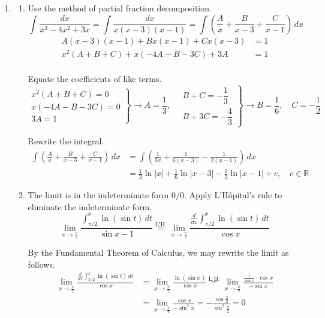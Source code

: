 \documentclass[a4paper, 12pt]{article}
\begin{document}
\begin{enumerate}[leftmargin=*,label=\textbf{\arabic*.}]

\item \begin{enumerate}[leftmargin=*,label=\textbf{\alph*.}]
\item Use the method of partial fraction decomposition.
\[\int\frac{dx}{x^3-4x^2+3x}=\int\frac{dx}{x(x-3)(x-1)}=\int\left(\frac Ax+\frac B{x-3}+\frac C{x-1}\right)\,dx\]
\[\begin{array}{rc}A(x-3)(x-1)+Bx(x-1)+Cx(x-3)&=1\\x^2(A+B+C)+x(-4A-B-3C)+3A&=1\\&\end{array}\]

Equate the coefficients of like terms.
\[\left.\begin{array}{r}
x^2(A+B+C)=0\\
x(-4A-B-3C)=0\\
3A=1
\end{array}\right\}\rightarrow A=\frac13,\quad\left.\begin{array}{r}
B+C=-\dfrac13\\[1em]
B+3C=-\dfrac43
\end{array}\right\}\rightarrow B=\frac16,\quad C=-\frac12\]

Rewrite the integral.
\begin{align*}
\int\left(\frac Ax+\frac B{x-3}+\frac C{x-1}\right)\,dx&=\int\left(\frac1{3x}+\frac1{6(x-3)}-\frac1{2(x-1)}\right)\,dx\\[1em]&=\boxed{\frac13\ln|x|+\frac16\ln|x-3|-\frac12\ln|x-1|+c,\quad c\in\mathbb{R}}
\end{align*}

\item The limit is in the indeterminate form $0/0$. Apply L'Hôpital's rule to eliminate the indeterminate form.
\[\lim_{x\to\textstyle\frac\pi2}\frac{\displaystyle\int_{\pi/2}^x\ln(\sin t)\,dt}{\sin x-1}\overset{\text{L'H.}}{=}\lim_{x\to\textstyle\frac\pi2}\frac{\displaystyle\frac d{dx}\int_{\pi/2}^x\ln(\sin t)\,dt}{\cos x}\]

By the Fundamental Theorem of Calculus, we may rewrite the limit as follows.
\begin{align*}\lim_{x\to\textstyle\frac\pi2}\frac{\displaystyle\frac d{dx}\int_{\pi/2}^x\ln(\sin t)\,dt}{\cos x}&=\lim_{x\to\textstyle\frac\pi2}\frac{\ln(\sin x)}{\cos x}\overset{\text{L'H.}}{=}\lim_{x\to\textstyle\frac\pi2}\frac{\frac1{\sin x}\cdot\cos x}{-\sin x}\\[1em]&=\lim_{x\to\textstyle\frac\pi2}\frac{\cos x}{-\sin^2x}=-\frac{\cos\frac\pi2}{\sin^2\frac\pi2}=\boxed0\end{align*}


\end{enumerate}
\end{enumerate}
\end{document}
